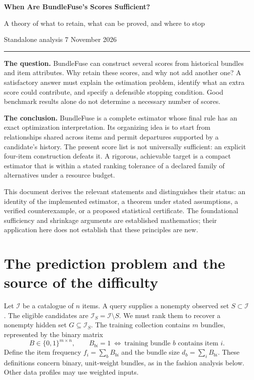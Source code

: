 \documentclass[11pt,a4paper]{article}
\begin{document}
\thispagestyle{plain}
{\Large\bfseries When Are BundleFuse's Scores Sufficient?\par}
{\large A theory of what to retain, what can be proved, and where to stop\par}
{\small Standalone analysis \hfill 7 November 2026\par}
\vspace{3pt}\hrule\vspace{7pt}

\textbf{The question.} BundleFuse can construct several scores from historical
bundles and item attributes. Why retain these scores, and why not add another
one? A satisfactory answer must explain the estimation problem, identify what
an extra score could contribute, and specify a defensible stopping condition.
Good benchmark results alone do not determine a necessary number of scores.

\textbf{The conclusion.} BundleFuse is a complete estimator whose final rule
has an exact optimization interpretation. Its organizing idea is to start from
relationships shared across items and permit departures supported by a
candidate's history. The present score list is not universally sufficient:
an explicit four-item construction defeats it. A rigorous, achievable target is
a compact estimator that is within a stated ranking tolerance of a declared
family of alternatives under a resource budget.

This document derives the relevant statements and distinguishes their status:
an identity of the implemented estimator, a theorem under stated assumptions,
a verified counterexample, or a proposed statistical certificate. The
foundational sufficiency and shrinkage arguments are established mathematics;
their application here does not establish that these principles are new.

\section{The prediction problem and the source of the difficulty}
\label{sec:problem}

Let $\mathcal I$ be a catalogue of $n$ items. A query supplies a nonempty
observed set $S\subset\mathcal I$. The eligible candidates are
$\mathcal I_S=\mathcal I\setminus S$. We must rank them to recover a nonempty
hidden set $G\subseteq\mathcal I_S$. The training collection contains $m$
bundles, represented by the binary matrix
\begin{equation}
 B\in\{0,1\}^{m\times n},\qquad
 B_{bi}=1\ \Longleftrightarrow\ \text{training bundle $b$ contains item $i$}.
\end{equation}
Define the item frequency $f_i=\sum_b B_{bi}$ and the bundle size
$d_b=\sum_i B_{bi}$. These definitions concern binary, unit-weight bundles,
as in the fashion analysis below. Other data profiles may use weighted inputs.
\end{document}
